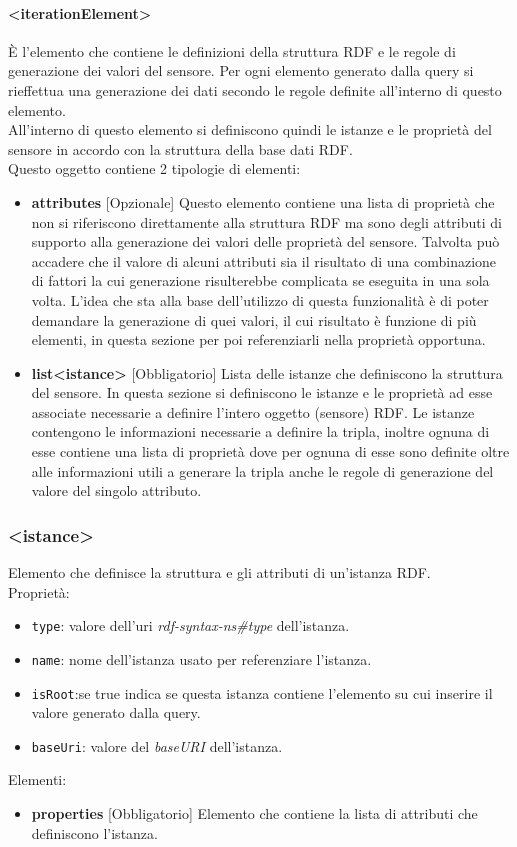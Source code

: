 \documentclass[12pt,a4paper,italian]{article}
\begin{document}
\paragraph{\large{<iterationElement>}}
\`E l'elemento che contiene le definizioni della struttura RDF e le regole di generazione dei valori del sensore. Per ogni elemento generato dalla query si
rieffettua una generazione dei dati secondo le regole definite all'interno di questo elemento.\\
All'interno di questo elemento si definiscono quindi le istanze e le proprietà del sensore in accordo con la struttura della base dati RDF.\\
Questo oggetto contiene 2 tipologie di elementi:
\begin{itemize}
	\item \textbf{attributes} [Opzionale] Questo elemento contiene una lista di proprietà che non si riferiscono direttamente alla struttura RDF ma sono degli attributi 
	di supporto alla generazione dei valori delle proprietà del sensore. Talvolta può accadere che il valore di alcuni attributi sia il risultato di una combinazione di fattori la cui generazione 
	risulterebbe complicata se eseguita in una sola volta. L'idea che sta alla base dell'utilizzo di questa funzionalità è di poter demandare la generazione di quei valori, il cui risultato è funzione di più elementi,
	in questa sezione per poi referenziarli nella proprietà opportuna.
	\item \textbf{list<istance>} [Obbligatorio] Lista delle istanze che definiscono la struttura del sensore. In questa sezione si definiscono le istanze e 
	le proprietà ad esse associate necessarie a definire l'intero oggetto (sensore) RDF. Le istanze contengono le informazioni necessarie a definire la tripla, inoltre ognuna di esse contiene 
	una lista di proprietà dove per ognuna di esse sono definite oltre alle informazioni utili a generare la tripla anche le regole di generazione del valore del singolo attributo.
\end{itemize} 
\subsubsection{<istance>}
Elemento che definisce la struttura e gli attributi di un'istanza RDF.\\
Proprietà:
\begin{itemize}
	\item \texttt{type}: valore dell'uri \emph{rdf-syntax-ns\#type} dell'istanza.
	\item \texttt{name}: nome dell'istanza usato per referenziare l'istanza.
	\item \texttt{isRoot}:se true indica se questa istanza contiene l'elemento su cui inserire il valore generato dalla query.
	\item \texttt{baseUri}: valore del \emph{baseURI} dell'istanza.
\end{itemize}
Elementi:
\begin{itemize}
	\item \textbf{properties} [Obbligatorio] Elemento che contiene la lista di attributi che definiscono l'istanza.
\end{itemize}
\end{document}
